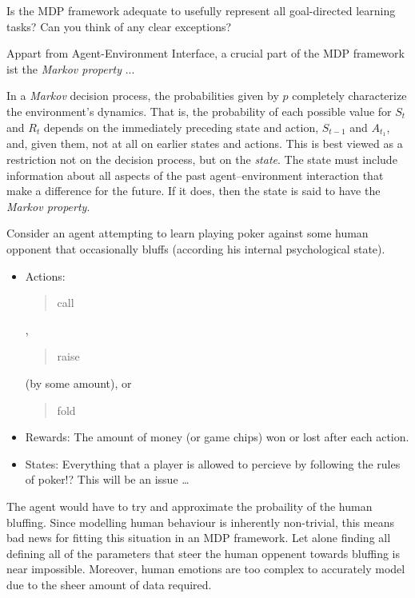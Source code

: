 
\begin{exercise}[Exercise 3.2]

Is the MDP framework adequate to usefully represent all goal-directed learning tasks?
Can you think of any clear exceptions?

\end{exercise}


\begin{solution}

Appart from Agent-Environment Interface, a crucial part of the MDP framework ist the \textit{Markov property} ...

\begin{displayquote}
    In a \textit{Markov} decision process, the probabilities given by $p$ completely characterize the environment's dynamics.
    That is, the probability of each possible value for $S_t$ and $R_t$ depends on the immediately preceding state and action, $S_{t-1}$ and $A_{t_1}$, and, given them, not at all on earlier states and actions.
    This is best viewed as a restriction not on the decision process, but on the \textit{state}.
    The state must include information about all aspects of the past agent–environment interaction that make a difference for the future.
    If it does, then the state is said to have the \textit{Markov property}.    
\end{displayquote}

Consider an agent attempting to learn playing poker against some human opponent that occasionally bluffs (according his internal psychological state).

\begin{itemize}
    \item Actions:
    \blockquote{call}, \blockquote{raise} (by some amount), or \blockquote{fold};
    \item Rewards:
    The amount of money (or game chips) won or lost after each action.
    \item States:
    Everything that a player is allowed to percieve by following the rules of poker!?
    This will be an issue \dots
\end{itemize}

The agent would have to try and approximate the probaility of the human bluffing.
Since modelling human behaviour is inherently non-trivial, this means bad news for fitting this situation in an MDP framework.
Let alone finding all defining all of the parameters that steer the human oppenent towards bluffing is near impossible.
Moreover, human emotions are too complex to accurately model due to the sheer amount of data required.


\end{solution}
